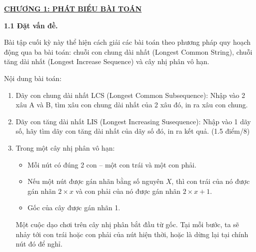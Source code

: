 \newpage
\changefontsizes{16pt}
\centerline{\textbf{\hyperlink{page.6}{CHƯƠNG 1: PHÁT BIỂU BÀI TOÁN}}}



\bigskip
\changefontsizes{14pt}

\setlength{\parindent}{0.0cm}
\textbf{1.1 Đặt vấn đề.}

\smallskip
\changefontsizes{13pt}
\setlength{\parindent}{1cm}


Bài tập cuối kỳ này thể hiện cách giải các bài toán theo phương pháp quy hoạch động qua ba bài toán: chuỗi con chung dài nhất (Longest Common String), chuỗi tăng dài nhất (Longest Increase Sequence) và cây nhị phân vô hạn.

\smallskip
Nội dung bài toán:

\vspace{-0.35cm}
\begin{enumerate}
	
	\item Dãy con chung dài nhất LCS (Longest Common Subsequence): Nhập vào 2 xâu A và B, tìm xâu con chung dài nhất của 2 xâu đó, in ra xâu con chung.
	
	\vspace{-0.35cm}
	\item Dãy con tăng dài nhất LIS (Longest Increasing Susequence): Nhập vào 1 dãy số, hãy tìm dãy con tăng dài nhất của dãy số đó, in ra kết quả. (1.5 điểm/8)
	
	
	\vspace{-0.35cm}
	\item Trong một cây nhị phân vô hạn:
	
	
	\vspace{-0.4cm}
	\begin{itemize}
		\item Mỗi nút có đúng 2 con – một con trái và một con phải.
		\vspace{-0.1cm}
		\item Nếu một nút được gán nhãn bằng số nguyên $X$, thì con trái của nó được gán nhãn $2 \times x$ và con phải của nó được gán nhãn $2 \times x + 1$.
		\vspace{-0.1cm}
		\item Gốc của cây được gán nhãn 1.
	\end{itemize}
	
	\vspace{-0.35cm}
	Một cuộc dạo chơi trên cây nhị phân bắt đầu từ gốc. Tại mỗi bước, ta sẽ nhảy tới con trái hoặc con phải của nút hiện thời, hoặc là dừng lại tại chính nút đó để nghỉ.
	

\end{enumerate}

